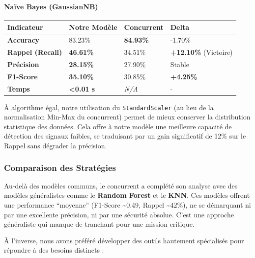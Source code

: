\documentclass[11pt]{article}
\begin{document}
\paragraph{Naïve Bayes (GaussianNB)}\label{nauxefve-bayes-gaussiannb}

\begin{longtable}[]{@{}llll@{}}
  \toprule\noalign{}
  Indicateur               & Notre Modèle             & Concurrent       & Delta            \\
  \midrule\noalign{}
  \endhead
  \bottomrule\noalign{}
  \endlastfoot
  \textbf{Accuracy}        & 83.23\%                  & \textbf{84.93\%} & -1.70\%          \\
  \textbf{Rappel (Recall)} & \textbf{46.61\%}         & 34.51\%          &
  \textbf{+12.10\%} (Victoire)                                                              \\
  \textbf{Précision}       & \textbf{28.15\%}         & 27.90\%          & Stable           \\
  \textbf{F1-Score}        & \textbf{35.10\%}         & 30.85\%          & \textbf{+4.25\%} \\
  \textbf{Temps}           & \textbf{\textless0.01 s} & \emph{N/A}       & -                \\
\end{longtable}

À algorithme égal, notre utilisation du \texttt{StandardScaler} (au lieu
de la normalisation Min-Max du concurrent) permet de mieux conserver la
distribution statistique des données. Cela offre à notre modèle une
meilleure capacité de détection des signaux faibles, se traduisant par
un gain significatif de 12\% sur le Rappel sans dégrader la précision.

\subsubsection{Comparaison des
  Stratégies}\label{comparaison-des-stratuxe9gies}

Au-delà des modèles communs, le concurrent a complété son analyse avec
des modèles généralistes comme le \textbf{Random Forest} et le
\textbf{KNN}. Ces modèles offrent une performance ``moyenne'' (F1-Score
\textasciitilde0.49, Rappel \textasciitilde42\%), ne se démarquant ni
par une excellente précision, ni par une sécurité absolue. C'est une
approche généraliste qui manque de tranchant pour une mission critique.

À l'inverse, nous avons préféré développer des outils hautement
spécialisés pour répondre à des besoins distincts :
\end{document}

